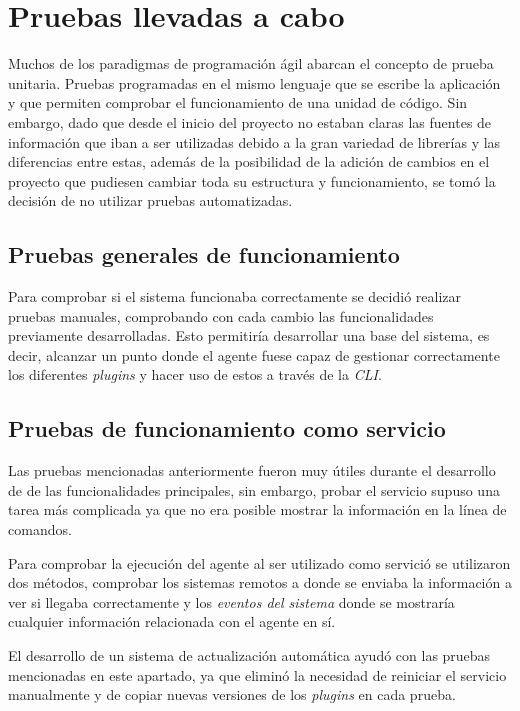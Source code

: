 \section{Pruebas llevadas a cabo} \label{sec:pru}
    
    Muchos de los paradigmas de programación ágil abarcan el concepto de prueba unitaria. Pruebas programadas en el mismo lenguaje que se escribe la aplicación y que permiten comprobar el funcionamiento de una unidad de código. Sin embargo, dado que desde el inicio del proyecto no estaban claras las fuentes de información que iban a ser utilizadas debido a la gran variedad de librerías y las diferencias entre estas, además de la posibilidad de la adición de cambios en el proyecto que pudiesen cambiar toda su estructura y funcionamiento, se tomó la decisión de no utilizar pruebas automatizadas.
    
    \subsection{Pruebas generales de funcionamiento}
        Para comprobar si el sistema funcionaba correctamente se decidió realizar pruebas manuales, comprobando con cada cambio las funcionalidades previamente desarrolladas. Esto permitiría desarrollar una base del sistema, es decir, alcanzar un punto donde el agente fuese capaz de gestionar correctamente los diferentes \textit{plugins} y hacer uso de estos a través de la \textit{CLI}.
        
    \subsection{Pruebas de funcionamiento como servicio}
        Las pruebas mencionadas anteriormente fueron muy útiles durante el desarrollo de de las funcionalidades principales, sin embargo, probar el servicio supuso una tarea más complicada ya que no era posible mostrar la información en la línea de comandos.
        
        Para comprobar la ejecución del agente al ser utilizado como servició se utilizaron dos métodos, comprobar los sistemas remotos a donde se enviaba la información a ver si llegaba correctamente y los \textit{eventos del sistema} donde se mostraría cualquier información relacionada con el agente en sí.
        
        El desarrollo de un sistema de actualización automática ayudó con las pruebas mencionadas en este apartado, ya que eliminó la necesidad de reiniciar el servicio manualmente y de copiar nuevas versiones de los \textit{plugins} en cada prueba.
    
